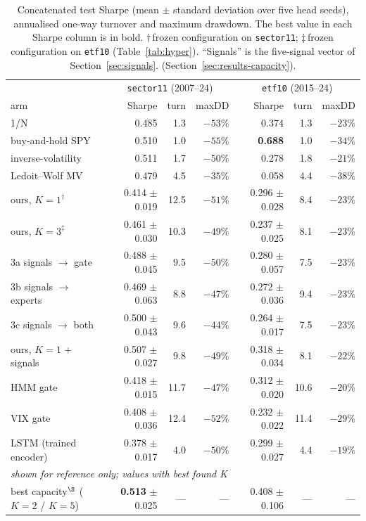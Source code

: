 \begin{table}[t]
  \centering
  \small
  \begin{tabular}{l rrr rrr}
    \hline
    & \multicolumn{3}{c}{\texttt{sector11} (2007--24)}
    & \multicolumn{3}{c}{\texttt{etf10} (2015--24)} \\
    arm & Sharpe & turn & maxDD & Sharpe & turn & maxDD \\
    \hline
    1/N                      & 0.485 & 1.3 & $-53\%$ & 0.374 & 1.3 & $-23\%$ \\
    buy-and-hold SPY         & 0.510 & 1.0 & $-55\%$ & \textbf{0.688} & 1.0 & $-34\%$ \\
    inverse-volatility       & 0.511 & 1.7 & $-50\%$ & 0.278 & 1.8 & $-21\%$ \\
    Ledoit--Wolf MV          & 0.479 & 4.5 & $-35\%$ & 0.058 & 4.4 & $-38\%$ \\
    \hline
    ours, $K{=}1^{\dagger}$            & 0.414 $\pm$ 0.019 & 12.5 & $-51\%$ & 0.296 $\pm$ 0.028 & 8.4 & $-23\%$ \\
    ours, $K{=}3^{\ddagger}$           & 0.461 $\pm$ 0.030 & 10.3 & $-49\%$ & 0.237 $\pm$ 0.025 & 8.1 & $-23\%$ \\
    3a signals $\to$ gate    & 0.488 $\pm$ 0.045 &  9.5 & $-50\%$ & 0.280 $\pm$ 0.057 & 7.5 & $-23\%$ \\
    3b signals $\to$ experts & 0.469 $\pm$ 0.063 &  8.8 & $-47\%$ & 0.272 $\pm$ 0.036 & 9.4 & $-23\%$ \\
    3c signals $\to$ both    & 0.500 $\pm$ 0.043 &  9.6 & $-44\%$ & 0.264 $\pm$ 0.017 & 7.5 & $-23\%$ \\
    ours, $K{=}1$ + signals  & 0.507 $\pm$ 0.027 &  9.8 & $-49\%$ & 0.318 $\pm$ 0.034 & 8.1 & $-22\%$ \\
    \hline
    HMM gate                 & 0.418 $\pm$ 0.015 & 11.7 & $-47\%$ & 0.312 $\pm$ 0.020 & 10.6 & $-20\%$ \\
    VIX gate                 & 0.408 $\pm$ 0.036 & 12.4 & $-52\%$ & 0.232 $\pm$ 0.022 & 11.4 & $-29\%$ \\
    LSTM (trained encoder)   & 0.378 $\pm$ 0.017 &  4.0 & $-50\%$ & 0.299 $\pm$ 0.027 & 4.4 & $-19\%$ \\
    \hline
    \multicolumn{7}{l}{\emph{shown for reference only; values with best found K}}\\
    best capacity$^{\S}$ ($K{=}2$ / $K{=}5$)
                             & \textbf{0.513} $\pm$ 0.025 & --- & --- & 0.408 $\pm$ 0.106 & --- & --- \\
    \hline
  \end{tabular}
  \caption[The walk-forward ladder]{Concatenated test Sharpe (mean $\pm$
  standard deviation over five head seeds), annualised one-way turnover and
  maximum drawdown. The best value in each Sharpe column is in
  bold. $\dagger$\,frozen configuration on \texttt{sector11};
  $\ddagger$\,frozen configuration on \texttt{etf10}
  (Table~\ref{tab:hyper}). ``Signals'' is the five-signal vector of
  Section~\ref{sec:signals}.
  (Section~\ref{sec:results-capacity}).}
  \label{tab:ladder}
\end{table}
